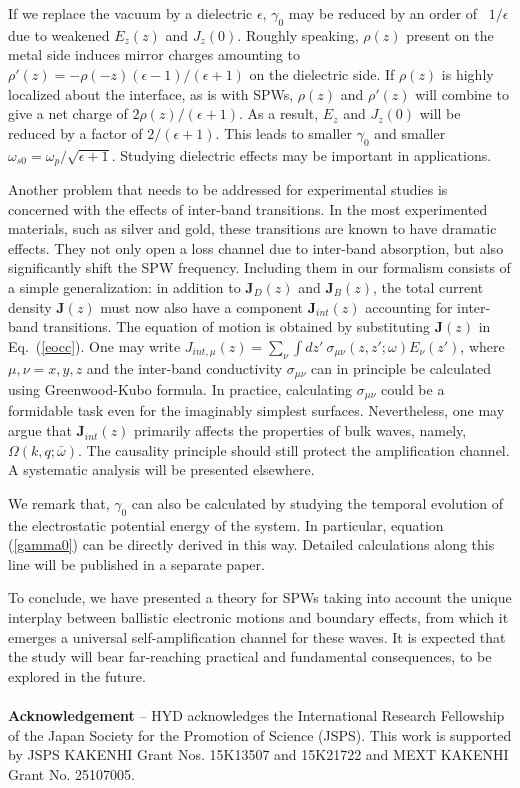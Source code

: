 \documentclass[aps,reprint]{revtex4-1}
\begin{document}
If we replace the vacuum by a dielectric $\epsilon$, $\gamma_0$ may
be reduced by an order of ~$1/\epsilon$ due to weakened $E_z(z)$ and $J_z(0)$. Roughly speaking, $\rho(z)$ present on the metal side
induces mirror charges amounting to
$\rho'(z)=-\rho(-z)(\epsilon-1)/(\epsilon+1)$ on the dielectric
side. If $\rho(z)$ is highly localized about the interface, as is
with SPWs, $\rho(z)$
and $\rho'(z)$ will combine to give a net charge of
$2\rho(z)/(\epsilon+1)$. As a result, $E_z$ and $J_z(0)$ will be
reduced by a factor of $2/(\epsilon+1)$. This leads to smaller
$\gamma_0$ and smaller $\omega_{s0}=\omega_p/\sqrt{\epsilon+1}$. Studying dielectric effects may be important in applications. 

Another problem that needs to be addressed for experimental studies is concerned with the effects of inter-band transitions. In the most experimented materials, such as silver and gold, these transitions are known to have dramatic effects. They not only open a loss channel due to inter-band absorption, but also significantly shift the SPW frequency. Including them in our formalism consists of a simple generalization: in addition to $\mathbf{J}_D(z)$ and $\mathbf{J}_B(z)$, the total current density $\mathbf{J}(z)$ must now also have a component $\mathbf{J}_{int}(z)$ accounting for inter-band transitions. The equation of motion is obtained by substituting $\mathbf{J}(z)$ in Eq.~(\ref{eocc}). One may write $J_{int,\mu}(z) = \sum_{\nu}\int dz'~\sigma_{\mu\nu}(z,z';\omega)E_{\nu}(z')$, where $\mu, \nu = x,y,z$ and the inter-band conductivity $\sigma_{\mu\nu}$ can in principle be calculated using Greenwood-Kubo formula. In practice, calculating $\sigma_{\mu\nu}$ could be a formidable task even for the imaginably simplest surfaces. Nevertheless, one may argue that $\mathbf{J}_{int}(z)$ primarily affects the properties of bulk waves, namely, $\Omega(k,q;\bar{\omega})$. The causality principle should still protect the amplification channel. A systematic analysis will be presented elsewhere. 

We remark that, $\gamma_0$ can also be calculated by studying the temporal evolution of the electrostatic potential energy of the system. In particular, equation (\ref{gamma0}) can be directly derived in this way. Detailed calculations along this line will be published in a separate paper. 
 
To conclude, we have presented a theory for SPWs taking into account the unique interplay between ballistic electronic motions and boundary effects, from which it emerges a universal self-amplification channel for these waves. It is expected that the study will bear far-reaching practical and fundamental consequences, to be explored in the future. 
\\
\\
\noindent
\textbf{Acknowledgement} -- HYD acknowledges the International Research
Fellowship of the Japan Society for the Promotion of Science
(JSPS). This work is supported by JSPS KAKENHI Grant Nos. 15K13507 and 15K21722 and
MEXT KAKENHI Grant No. 25107005.
\end{document}
